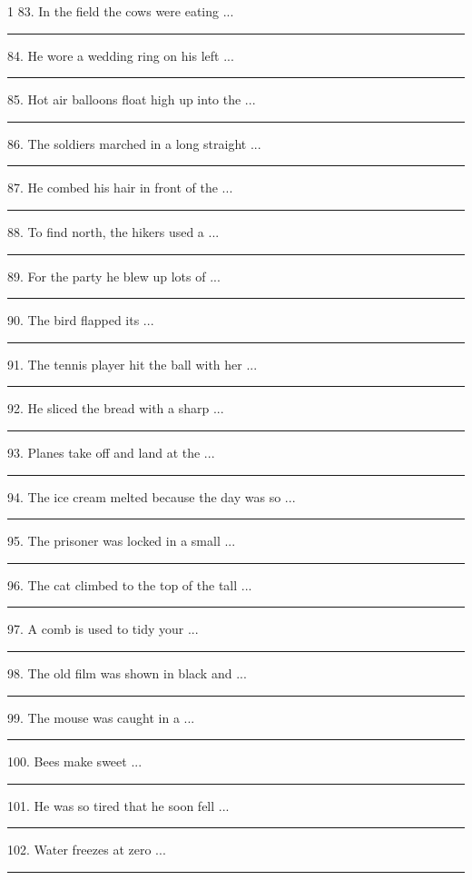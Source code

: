 \documentclass[11pt,a4paper]{article}
\newcommand{\blank}[1][1.2cm]{\rule{#1}{0.4pt}}
\begin{document}
\begin{multicols}{1}
83. In the field the cows were eating ...\hfill\blank[3cm]\par\vspace{3pt}
84. He wore a wedding ring on his left ...\hfill\blank[3cm]\par\vspace{3pt}
85. Hot air balloons float high up into the ...\hfill\blank[3cm]\par\vspace{3pt}
86. The soldiers marched in a long straight ...\hfill\blank[3cm]\par\vspace{3pt}
87. He combed his hair in front of the ...\hfill\blank[3cm]\par\vspace{3pt}
88. To find north, the hikers used a ...\hfill\blank[3cm]\par\vspace{3pt}
89. For the party he blew up lots of ...\hfill\blank[3cm]\par\vspace{3pt}
90. The bird flapped its ...\hfill\blank[3cm]\par\vspace{3pt}
91. The tennis player hit the ball with her ...\hfill\blank[3cm]\par\vspace{3pt}
92. He sliced the bread with a sharp ...\hfill\blank[3cm]\par\vspace{3pt}
93. Planes take off and land at the ...\hfill\blank[3cm]\par\vspace{3pt}
94. The ice cream melted because the day was so ...\hfill\blank[3cm]\par\vspace{3pt}
95. The prisoner was locked in a small ...\hfill\blank[3cm]\par\vspace{3pt}
96. The cat climbed to the top of the tall ...\hfill\blank[3cm]\par\vspace{3pt}
97. A comb is used to tidy your ...\hfill\blank[3cm]\par\vspace{3pt}
98. The old film was shown in black and ...\hfill\blank[3cm]\par\vspace{3pt}
99. The mouse was caught in a ...\hfill\blank[3cm]\par\vspace{3pt}
100. Bees make sweet ...\hfill\blank[3cm]\par\vspace{3pt}
101. He was so tired that he soon fell ...\hfill\blank[3cm]\par\vspace{3pt}
102. Water freezes at zero ...\hfill\blank[3cm]\par\vspace{3pt}\end{multicols}
\end{document}
